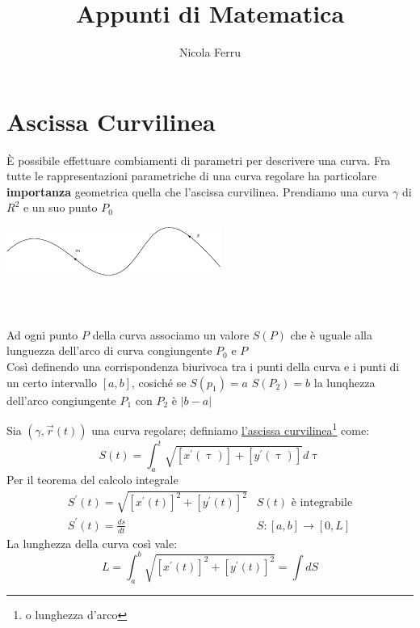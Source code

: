 \documentclass{book}
\title{Appunti di Matematica}
\author{Nicola Ferru}
\date{}
\newcommand{\abs}[1]{\lvert#1\rvert}
\begin{document}


\tableofcontents
\listoftables
\listoffigures







\section{Ascissa Curvilinea}
È possibile effettuare combiamenti di parametri per descrivere una curva. Fra
tutte le rappresentazioni parametriche di una curva regolare ha particolare
\textbf{importanza} geometrica quella che {\color{red}l'ascissa curvilinea}.
Prendiamo una curva $\gamma$ di $R^2$ e un suo punto $P_0$
\begin{multicols}{2}
	\includegraphics[width=7cm]{img/finiti/ascissa_curvilinea.eps}\\\\\\\\
	Ad ogni punto $P$ della curva associamo un valore $S(P)$ che è uguale
	alla lunguezza dell'arco di curva congiungente $P_0$ e $P$\\
	Così definendo una corrispondenza biurivoca tra i punti della curva e i
	punti di un certo intervallo $[a,b]$, cosiché se $S(p_1)=a$ $S(P_2)=b$ la
	lunqhezza dell'arco congiungente $P_1$ con $P_2$ è $\abs{b-a}$
\end{multicols}
Sia $(\gamma,\vec{r}(t))$ una curva regolare; definiamo \underline{l'ascissa
curvilinea}\footnote{o lunghezza d'arco} come:
\begin{equation*}
	S(t)= \int_{a}^{t}\sqrt{[x^\prime (\uptau)]+[y^\prime(\uptau)]} d\uptau
\end{equation*}
Per il teorema del calcolo integrale
\begin{equation*}
	\begin{matrix}
		S^\prime(t)=\sqrt{[x^\prime(t)]^2+[y^\prime(t)]^2} & S(t) \text{ è
		integrabile}\\
		S^\prime(t)=\frac{ds}{dt} & S:[a,b]\to [0,L]
	\end{matrix}
\end{equation*}
La lunghezza della curva così vale:
\begin{equation}
	L=\int_{a}^{b}\sqrt{[x^\prime(t)]^2+[y^\prime(t)]^2}=\int dS
\end{equation}
\end{document}
